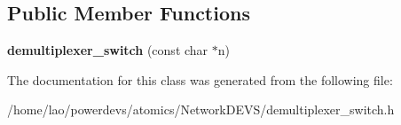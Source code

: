 \subsection*{Public Member Functions}
\begin{DoxyCompactItemize}
\item 
{\bfseries demultiplexer\+\_\+switch} (const char $\ast$n)\hypertarget{classdemultiplexer__switch_a7e1728adcdcb9628a53c66e2c2e8ad3d}{}\label{classdemultiplexer__switch_a7e1728adcdcb9628a53c66e2c2e8ad3d}

\end{DoxyCompactItemize}


The documentation for this class was generated from the following file\+:\begin{DoxyCompactItemize}
\item 
/home/lao/powerdevs/atomics/\+Network\+D\+E\+V\+S/demultiplexer\+\_\+switch.\+h\end{DoxyCompactItemize}
